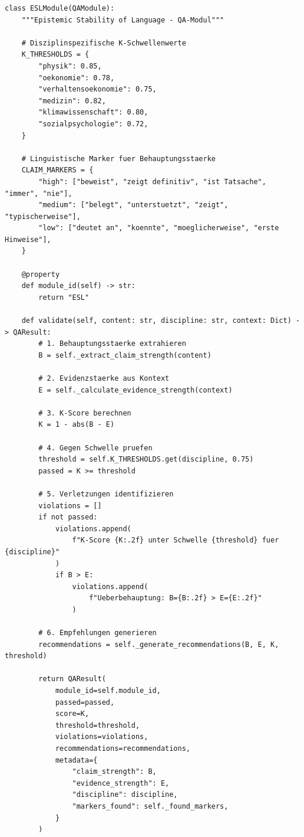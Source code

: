 \begin{lstlisting}[caption={ESL-Modul: Referenzimplementierung}]
class ESLModule(QAModule):
    """Epistemic Stability of Language - QA-Modul"""

    # Disziplinspezifische K-Schwellenwerte
    K_THRESHOLDS = {
        "physik": 0.85,
        "oekonomie": 0.78,
        "verhaltensoekonomie": 0.75,
        "medizin": 0.82,
        "klimawissenschaft": 0.80,
        "sozialpsychologie": 0.72,
    }

    # Linguistische Marker fuer Behauptungsstaerke
    CLAIM_MARKERS = {
        "high": ["beweist", "zeigt definitiv", "ist Tatsache", "immer", "nie"],
        "medium": ["belegt", "unterstuetzt", "zeigt", "typischerweise"],
        "low": ["deutet an", "koennte", "moeglicherweise", "erste Hinweise"],
    }

    @property
    def module_id(self) -> str:
        return "ESL"

    def validate(self, content: str, discipline: str, context: Dict) -> QAResult:
        # 1. Behauptungsstaerke extrahieren
        B = self._extract_claim_strength(content)

        # 2. Evidenzstaerke aus Kontext
        E = self._calculate_evidence_strength(context)

        # 3. K-Score berechnen
        K = 1 - abs(B - E)

        # 4. Gegen Schwelle pruefen
        threshold = self.K_THRESHOLDS.get(discipline, 0.75)
        passed = K >= threshold

        # 5. Verletzungen identifizieren
        violations = []
        if not passed:
            violations.append(
                f"K-Score {K:.2f} unter Schwelle {threshold} fuer {discipline}"
            )
            if B > E:
                violations.append(
                    f"Ueberbehauptung: B={B:.2f} > E={E:.2f}"
                )

        # 6. Empfehlungen generieren
        recommendations = self._generate_recommendations(B, E, K, threshold)

        return QAResult(
            module_id=self.module_id,
            passed=passed,
            score=K,
            threshold=threshold,
            violations=violations,
            recommendations=recommendations,
            metadata={
                "claim_strength": B,
                "evidence_strength": E,
                "discipline": discipline,
                "markers_found": self._found_markers,
            }
        )


\end{lstlisting}
